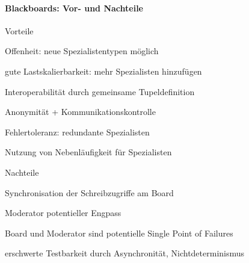 \documentclass[10pt]{article}
\begin{document}
\paragraph{Blackboards: Vor- und Nachteile}

\begin{itemize*}
  \item Vorteile
  \begin{itemize*}
    \item Offenheit: neue Spezialistentypen möglich
    \item gute Lastskalierbarkeit: mehr Spezialisten hinzufügen
    \item Interoperabilität durch gemeinsame Tupeldefinition
    \item Anonymität + Kommunikationskontrolle
    \item Fehlertoleranz: redundante Spezialisten
    \item Nutzung von Nebenläufigkeit für Spezialisten
  \end{itemize*}
  \item Nachteile
  \begin{itemize*}
    \item Synchronisation der Schreibzugriffe am Board
    \item Moderator potentieller Engpass
    \item Board und Moderator sind potentielle Single Point of Failures
    \item erschwerte Testbarkeit durch Asynchronität, Nichtdeterminismus
  \end{itemize*}
\end{itemize*}
\end{document}
